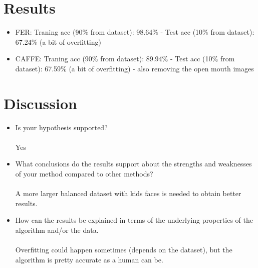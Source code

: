 \documentclass[runningheads,a4paper,11pt]{report}
\begin{document}
\section{Results}
\label{section:results}


\begin{itemize}
  \item FER: Traning acc (90\% from dataset): 98.64\% - Test acc (10\% from dataset): 67.24\% (a bit of overfitting)
  \item CAFFE: Traning acc (90\% from dataset): 89.94\% - Test acc (10\% from dataset): 67.59\% (a bit of overfitting) - also removing the open mouth images
\end{itemize}

\section{Discussion}
\label{section:discussion}

\begin{itemize}
	\item Is your hypothesis supported?
  \paragraph{}
  Yes
	\item What conclusions do the results support about the strengths and weaknesses of your method compared to other methods?
  \paragraph{}
  A more larger balanced dataset with kids faces is needed to obtain better results.
	\item How can the results be explained in terms of the underlying properties of the algorithm and/or the data.
  \paragraph{}
  Overfitting could happen sometimes (depends on the dataset), but the algorithm
  is pretty accurate as a human can be.
\end{itemize}
\end{document}
